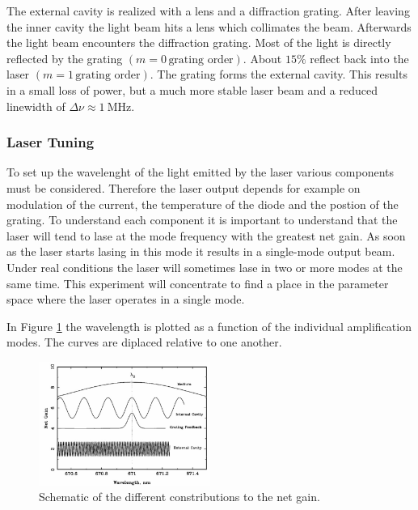 The external cavity is realized with a lens and a diffraction grating. After leaving the inner cavity the light beam hits a lens which collimates the beam.
Afterwards the light beam encounters the diffraction grating. Most of the light is directly reflected by the grating  $\left(m = 0 \, \text{grating order}\right)$.
About $ 15 \% $ reflect back into the laser $\left(m = 1  \,\text{grating order}\right)$. The grating forms the external cavity.
This results in a small loss of power, but a much more stable laser beam and a reduced linewidth of $\Delta \nu \approx \qty{1}{\mega\hertz}$.

\subsubsection{Laser Tuning}
\label{sec:Laser Tuning}

To set up the wavelenght of the light emitted by the laser various components must be considered.
Therefore the laser output depends for example on modulation of the current, the temperature of the diode and the postion of the grating.
To understand each component it is important to understand that the laser will tend to lase at the mode frequency with the greatest net gain.
As soon as the laser starts lasing in this mode it results in a single-mode output beam. Under real conditions the laser will sometimes lase 
in two or more modes at the same time. This experiment will concentrate to find a place in the parameter space where the laser operates in a single mode.

In Figure \ref{fig:netgain} the wavelength is plotted as a function of the individual amplification modes. The curves are diplaced relative to one another.
\begin{figure}[H]
    \centering
    \includegraphics[width=0.5\textwidth]{content/graphics/net_gain_components.jpg}
    \caption{Schematic of the different constributions to the net gain. \cite{diode_laser}} %
    \label{fig:netgain}
\end{figure}


